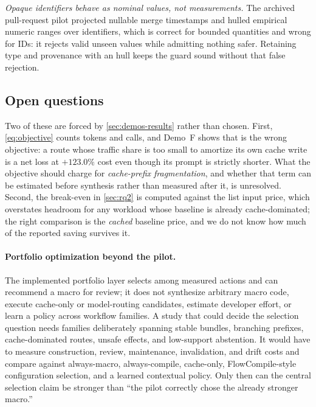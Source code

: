 \emph{Opaque identifiers behave as nominal values, not measurements.} The archived
pull-request pilot projected nullable merge timestamps and hulled empirical numeric ranges
over identifiers, which is correct for bounded quantities and wrong for IDs: it rejects
valid unseen values while admitting nothing safer.  Retaining type and provenance with an
 hull keeps the guard sound without that false rejection.

\subsection{Open questions}
\label{sec:extension}

Two of these are forced by \cref{sec:demos-results} rather than chosen.  First,
\cref{eq:objective} counts tokens and calls, and Demo~F shows that is the wrong objective:
a route whose traffic share is too small to amortize its own cache write is a net loss at
$+123.0\%$ cost even though its prompt is strictly shorter.  What the objective should
charge for \emph{cache-prefix fragmentation}, and whether that term can be estimated
before synthesis rather than measured after it, is unresolved.  Second, the break-even in
\cref{sec:rq2} is computed against the list input price, which overstates headroom for any
workload whose baseline is already cache-dominated; the right comparison is the
\emph{cached} baseline price, and we do not know how much of the reported saving survives
it.

\paragraph{Portfolio optimization beyond the pilot.}
The implemented portfolio layer selects among measured actions and can recommend a macro
for review; it does not synthesize arbitrary macro code, execute cache-only or
model-routing candidates, estimate
developer effort, or learn a policy across workflow families.  A study that could decide
the selection question needs families deliberately spanning stable bundles, branching
prefixes, cache-dominated
routes, unsafe effects, and low-support abstention.  It would have to measure construction,
review, maintenance, invalidation, and drift costs and compare against always-macro,
always-compile, cache-only, FlowCompile-style configuration selection, and a learned
contextual policy.  Only then can the central selection claim be stronger than ``the pilot
correctly chose the already stronger macro.''


